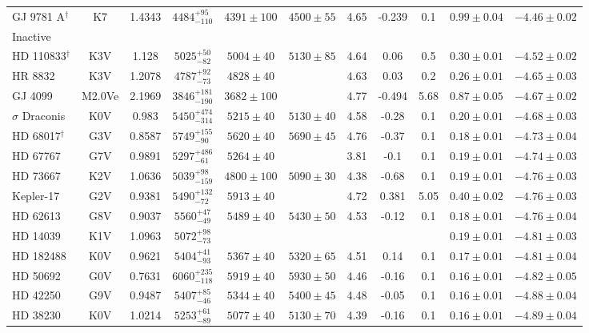 \begin{tiny}
\begin{longtable}{l|c|c|ccc|ccc|cc}
GJ 9781 A$^\dagger$ & K7 & 1.4343 & $4484^{+95}_{-110}$ & $4391 \pm 100$ & $4500 \pm 55$ & 4.65 & -0.239 & 0.1 & $0.99 \pm 0.04$ & $-4.46 \pm 0.02$ \\
Inactive & & & & & & & & & & \\
HD 110833$^\dagger$ & K3V & 1.128 & $5025^{+50}_{-82}$ & $5004 \pm 40$ & $5130 \pm 85$ & 4.64 & 0.06 & 0.5 & $0.30 \pm 0.01$ & $-4.52 \pm 0.02$ \\
HR 8832 & K3V & 1.2078 & $4787^{+92}_{-73}$ & $4828 \pm 40$ &  & 4.63 & 0.03 & 0.2 & $0.26 \pm 0.01$ & $-4.65 \pm 0.03$ \\
GJ 4099 & M2.0Ve & 2.1969 & $3846^{+181}_{-190}$ & $3682 \pm 100$ &  & 4.77 & -0.494 & 5.68 & $0.87 \pm 0.05$ & $-4.67 \pm 0.02$  \\
$\sigma$ Draconis & K0V & 0.983 & $5450^{+474}_{-314}$ & $5215 \pm 40$ & $5130 \pm 40$ & 4.58 & -0.28 & 0.1 & $0.20 \pm 0.01$ & $-4.68 \pm 0.03$ \\
HD 68017$^\dagger$ & G3V & 0.8587 & $5749^{+155}_{-90}$ & $5620 \pm 40$ & $5690 \pm 45$ & 4.76 & -0.37 & 0.1 & $0.18 \pm 0.01$ & $-4.73 \pm 0.04$ \\
HD 67767 & G7V & 0.9891 & $5297^{+486}_{-61}$ & $5264 \pm 40$ &  & 3.81 & -0.1 & 0.1 & $0.19 \pm 0.01$ & $-4.74 \pm 0.03$ \\
HD 73667 & K2V & 1.0636 & $5039^{+98}_{-159}$ & $4800 \pm 100$ & $5090 \pm 30$ & 4.38 & -0.68 & 0.1 & $0.19 \pm 0.01$ & $-4.76 \pm 0.03$ \\
Kepler-17 & G2V & 0.9381 & $5490^{+132}_{-72}$ & $5913 \pm 40$ &  & 4.72 & 0.381 & 5.05 & $0.40 \pm 0.02$ & $-4.76 \pm 0.03$  \\
HD 62613 & G8V & 0.9037 & $5560^{+47}_{-49}$ & $5489 \pm 40$ & $5430 \pm 50$ & 4.53 & -0.12 & 0.1 & $0.18 \pm 0.01$ & $-4.76 \pm 0.04$ \\
HD 14039 & K1V & 1.0963 & $5072^{+98}_{-73}$ &  &  &  &  &  & $0.19 \pm 0.01$ & $-4.81 \pm 0.03$   \\
HD 182488 & K0V & 0.9621 & $5404^{+41}_{-93}$ & $5367 \pm 40$ & $5320 \pm 65$ & 4.51 & 0.14 & 0.1 & $0.17 \pm 0.01$ & $-4.81 \pm 0.04$ \\
HD 50692 & G0V & 0.7631 & $6060^{+235}_{-118}$ & $5919 \pm 40$ & $5930 \pm 50$ & 4.46 & -0.16 & 0.1 & $0.16 \pm 0.01$ & $-4.82 \pm 0.05$ \\
HD 42250 & G9V & 0.9487 & $5407^{+85}_{-46}$ & $5344 \pm 40$ & $5400 \pm 45$ & 4.48 & -0.05 & 0.1 & $0.16 \pm 0.01$ & $-4.88 \pm 0.04$ \\
HD 38230 & K0V & 1.0214 & $5253^{+61}_{-89}$ & $5077 \pm 40$ & $5130 \pm 70$ & 4.39 & -0.16 & 0.1 & $0.16 \pm 0.01$ & $-4.89 \pm 0.04$ \\

\end{longtable}
\end{tiny}
